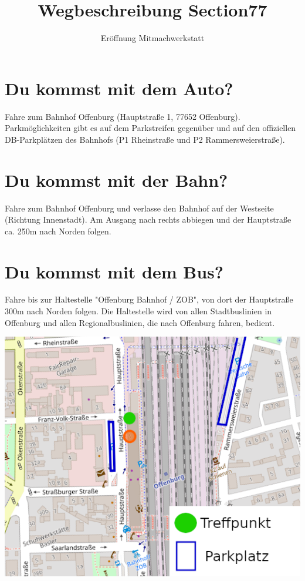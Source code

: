 \documentclass[10pt,a4paper]{scrartcl}
\title{Wegbeschreibung Section77}
\subtitle{Eröffnung Mitmachwerkstatt}
\begin{document}
\date{\vspace{-3em}}
\maketitle


\section*{Du kommst mit dem Auto?}
Fahre zum Bahnhof Offenburg (Hauptstraße 1, 77652 Offenburg). Parkmöglichkeiten gibt es auf dem Parkstreifen gegenüber und auf den offiziellen DB-Parkplätzen des Bahnhofs (P1 Rheinstraße und P2 Rammersweierstraße). \\

\section*{Du kommst mit der Bahn?} 
Fahre zum Bahnhof Offenburg und verlasse den Bahnhof auf der Westseite (Richtung Innenstadt). Am Ausgang nach rechts abbiegen und der Hauptstraße ca. 250m nach Norden folgen. \\

\section*{Du kommst mit dem Bus?}
Fahre bis zur Haltestelle "Offenburg Bahnhof / ZOB", von dort der Hauptstraße 300m nach Norden folgen. Die Haltestelle wird von allen Stadtbuslinien in Offenburg und allen Regionalbuslinien, die nach Offenburg fahren, bedient.

\vspace{5em}
\includegraphics{./location.png}
\end{document}
